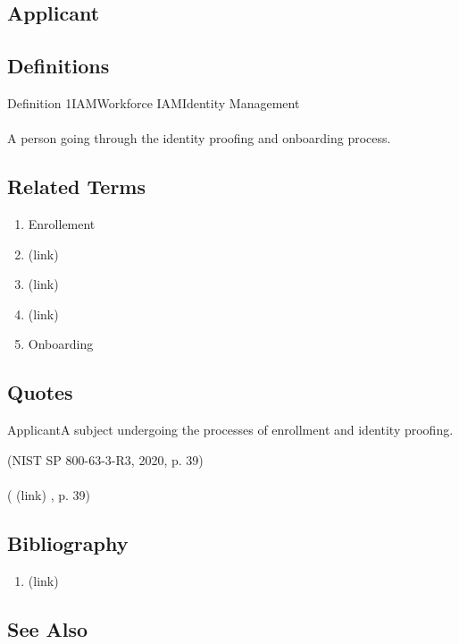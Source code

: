 \newpage \subsection*{Applicant } \subsection*{Definitions } \begin{DIC_Def}{Definition 1IAMWorkforce IAMIdentity Management }{} \paragraph{} A person going through the identity proofing and onboarding process.  \end{DIC_Def} \subsection*{Related Terms } \begin{enumerate} \item  Enrollement  \item  (link) \href{Entity (Dictionary Entry) }{ }   \item  (link) \href{Identity Proofing (Dictionary Entry) }{ }   \item  (link) \href{Joiner Process (Dictionary Entry) }{ }   \item  Onboarding  \end{enumerate} \subsection*{Quotes } \begin{DIC_BlockQuote} ApplicantA subject undergoing the processes of enrollment and identity proofing.  \end{DIC_BlockQuote} (NIST SP 800-63-3-R3, 2020, p. 39)  \paragraph{} (  (link) \href{NIST SP 800-63-3-R3, 2020 }{ } , p. 39)  \subsection*{Bibliography } \begin{enumerate} \item  (link) \href{NIST SP 800-63-3-R3, 2020 }{ }   \end{enumerate} \subsection*{See Also } 